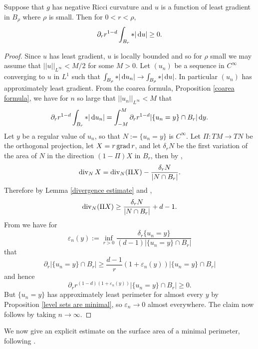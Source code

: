 \begin{proposition}\label{Monotonicity Formula}
Suppose that $g$ has negative Ricci curvature and $u$ is a function of least gradient in $B_\rho$ where $\rho$ is small. Then for $0 < r < \rho$,
$$\partial_r r^{1 - d} \int_{B_r} *|\mathop{}\!\mathrm{d} u| \geq 0.$$
\end{proposition}
\begin{proof}
Since $u$ has least gradient, $u$ is locally bounded and so for $\rho$ small we may assume that $||u||_{L^\infty} < M/2$ for some $M > 0$.
Let $(u_n)$ be a sequence in $C^\infty$ converging to $u$ in $L^1$ such that $\int_{B_\rho} *|\mathop{}\!\mathrm{d} u_n| \to \int_{B_\rho} *|\mathop{}\!\mathrm{d} u|$.
In particular $(u_n)$ has approximately least gradient.
From the coarea formula, Proposition \ref{coarea formula}, we have for $n$ so large that $||u_n||_{L^\infty} < M$ that
$$\partial_r r^{1 - d} \int_{B_r} *|\mathop{}\!\mathrm{d} u_n| = \int_{-M}^M \partial_r r^{1 - d} |\{u_n = y\} \cap B_r| \mathop{}\!\mathrm{d} y.$$
Let $y$ be a regular value of $u_n$, so that $N := \{u_n = y\}$ is $C^\infty$.
Let $\Pi: TM \to TN$ be the orthogonal projection, let $X = r\operatorname{grad} r$, and let $\delta_r N$ be the first variation of the area of $N$ in the direction $(1 - \Pi)X$ in $B_r$, then by \cite[Lemma 2.4, pg12]{MarquesXX},
$$\operatorname{div}_N X = \operatorname{div}_N(\Pi X) - \frac{\delta_r N}{|N \cap B_r|}.$$
Therefore by Lemma \ref{divergence estimate} and \cite[Proposition 7.4]{MarquesXX},
$$\operatorname{div}_N(\Pi X) \geq \frac{\delta_r N}{|N \cap B_r|} + d - 1.$$
From \cite[pg16]{MarquesXX} we have for
$$\varepsilon_n(y) := \inf_{r > 0} \frac{\delta_r \{u_n = y\}}{(d - 1)|\{u_n = y\} \cap B_r|}$$
that
$$\partial_r |\{u_n = y\} \cap B_r| \geq \frac{d - 1}{r} (1 + \varepsilon_n(y)) |\{u_n = y\} \cap B_r|$$
and hence
$$\partial_r r^{(1 - d)(1 + \varepsilon_n(y))} |\{u_n = y\} \cap B_r| \geq 0.$$
But $\{u_n = y\}$ has approximately least perimeter for almost every $y$ by Proposition \ref{level sets are minimal}, so $\varepsilon_n \to 0$ almost everywhere.
The claim now follows by taking $n \to \infty$.
\end{proof}

We now give an explicit estimate on the surface area of a minimal perimeter, following \cite[pg74]{Giusti77}.

